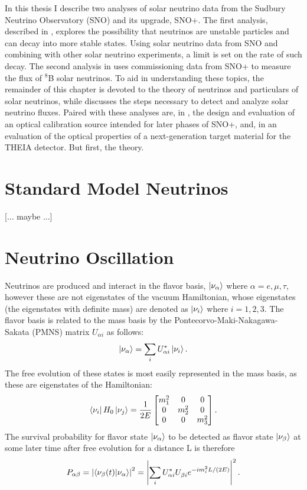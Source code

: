 In this thesis I describe two analyses of solar neutrino data from the Sudbury Neutrino Observatory (SNO) and its upgrade, SNO+.
The first analysis, described in , explores the possibility that neutrinos are unstable particles and can decay into more stable states.
Using solar neutrino data from SNO and combining with other solar neutrino experiments, a limit is set on the rate of such decay. 
The second analysis in  uses commissioning data from SNO+ to measure the flux of $^8$B solar neutrinos. 
To aid in understanding these topics, the remainder of this chapter is devoted to the theory of neutrinos and particulars of solar neutrinos, while  discusses the steps necessary to detect and analyze solar neutrino fluxes.
Paired with these analyses are, in , the design and evaluation of an optical calibration source intended for later phases of SNO+, and, in  an evaluation of the optical properties of a next-generation target material for the T\textsc{HEIA} detector.
But first, the theory.

\section{Standard Model Neutrinos}
[... maybe ...]

\section{Neutrino Oscillation}
\label{ch:theory}

Neutrinos are produced and interact in the flavor basis, $\ket{\nu_{\alpha}}$ where $\alpha = {e,\mu,\tau}$, however these are not eigenstates of the vacuum Hamiltonian, whose eigenstates (the eigenstates with definite mass) are denoted as $\ket{\nu_i}$ where $i = {1,2,3}$. 
The flavor basis is related to the mass basis by the Pontecorvo-Maki-Nakagawa-Sakata (PMNS) matrix $U_{\alpha i}$ as follows:
\begin{equation}
\ket{\nu_{\alpha}} = \sum_i U^*_{\alpha i} \ket{\nu_i}.
\end{equation}
The free evolution of these states is most easily represented in the mass basis, as these are eigenstates of the Hamiltonian:
\begin{equation}
\bra{\nu_i}H_{0}\ket{\nu_j} = \frac{1}{2E}\begin{bmatrix}
m_1^2 & 0 & 0 \\
0 & m_2^2 & 0 \\
0 & 0 & m_3^2
\end{bmatrix}.
\end{equation}
The survival probability for flavor state $\ket{\nu_\alpha}$ to be detected as flavor state $\ket{\nu_\beta}$ at some later time after free evolution for a distance L is therefore
\begin{equation}
P_{\alpha\beta} = \left|\braket{\nu_\beta(t)}{\nu_\alpha}\right|^2 = \left|\sum_i U^*_{\alpha i} U^{}_{\beta i} e^{- i m_i^2 L/(2E)} \right|^2.
\end{equation}

